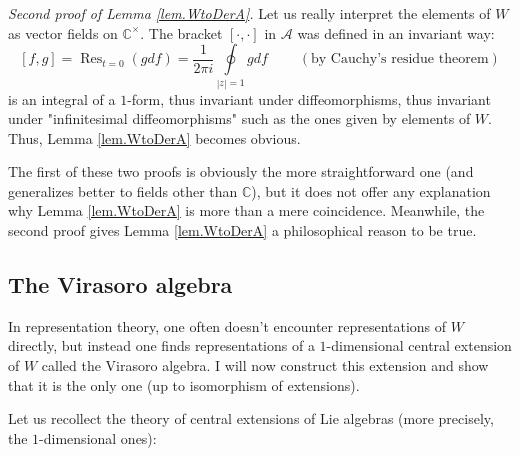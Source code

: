 \documentclass
[numbers=enddot,12pt,final,onecolumn,german,notitlepage]{scrartcl}%
\theoremstyle{definition}
\begin{document}
\textit{Second proof of Lemma \ref{lem.WtoDerA}.} Let us really interpret the
elements of $W$ as vector fields on $\mathbb{C}^{\times}$. The bracket
$\left[  \cdot,\cdot\right]  $ in $\mathcal{A}$ was defined in an invariant
way:%
\[
\left[  f,g\right]  =\operatorname*{Res}\nolimits_{t=0}\left(  gdf\right)
=\dfrac{1}{2\pi i}\oint\limits_{\left\vert z\right\vert =1}%
gdf\ \ \ \ \ \ \ \ \ \ \left(  \text{by Cauchy's residue theorem}\right)
\]
is an integral of a $1$-form, thus invariant under diffeomorphisms, thus
invariant under "infinitesimal diffeomorphisms" such as the ones given by
elements of $W$. Thus, Lemma \ref{lem.WtoDerA} becomes obvious.

The first of these two proofs is obviously the more straightforward one (and
generalizes better to fields other than $\mathbb{C}$), but it does not offer
any explanation why Lemma \ref{lem.WtoDerA} is more than a mere coincidence.
Meanwhile, the second proof gives Lemma \ref{lem.WtoDerA} a philosophical
reason to be true.

\subsection{The Virasoro algebra}

In representation theory, one often doesn't encounter representations of $W$
directly, but instead one finds representations of a $1$-dimensional central
extension of $W$ called the Virasoro algebra. I will now construct this
extension and show that it is the only one (up to isomorphism of extensions).

Let us recollect the theory of central extensions of Lie algebras (more
precisely, the $1$-dimensional ones):
\end{document}
